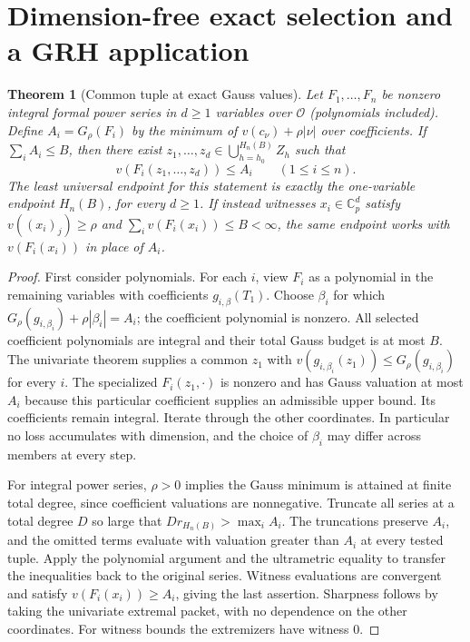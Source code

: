 \documentclass[11pt]{article}
\newtheorem{theorem}{Theorem}[section]
\theoremstyle{remark}\newtheorem{remark}[theorem]{Remark}
\newcommand{\Cp}{\mathbb C_p}
\newcommand{\OO}{\mathcal O}
\begin{document}
\section{Dimension-free exact selection and a GRH application}\label{sec:multi}
\begin{theorem}[Common tuple at exact Gauss values]\label{thm:multi}
Let $F_1,\ldots,F_n$ be nonzero integral formal power series in $d\ge1$ variables over $\OO$ (polynomials included). Define $A_i=G_\rho(F_i)$ by the minimum of $v(c_\nu)+\rho|\nu|$ over coefficients. If $\sum_i A_i\le B$, then there exist $z_1,\ldots,z_d\in\bigcup_{h=h_0}^{H_n(B)} Z_h$ such that
\[
 v(F_i(z_1,\ldots,z_d))\le A_i\qquad(1\le i\le n).
\]
The least universal endpoint for this statement is exactly the one-variable endpoint $H_n(B)$, for every $d\ge1$. If instead witnesses $x_i\in\Cp^d$ satisfy $v((x_i)_j)\ge\rho$ and $\sum_i v(F_i(x_i))\le B<\infty$, the same endpoint works with $v(F_i(x_i))$ in place of $A_i$.
\end{theorem}
\begin{proof}
First consider polynomials. For each $i$, view $F_i$ as a polynomial in the remaining variables with coefficients $g_{i,\beta}(T_1)$. Choose $\beta_i$ for which $G_\rho(g_{i,\beta_i})+\rho|\beta_i|=A_i$; the coefficient polynomial is nonzero. All selected coefficient polynomials are integral and their total Gauss budget is at most $B$. The univariate theorem supplies a common $z_1$ with $v(g_{i,\beta_i}(z_1))\le G_\rho(g_{i,\beta_i})$ for every $i$. The specialized $F_i(z_1,\cdot)$ is nonzero and has Gauss valuation at most $A_i$ because this particular coefficient supplies an admissible upper bound. Its coefficients remain integral. Iterate through the other coordinates. In particular no loss accumulates with dimension, and the choice of $\beta_i$ may differ across members at every step.

For integral power series, $\rho>0$ implies the Gauss minimum is attained at finite total degree, since coefficient valuations are nonnegative. Truncate all series at a total degree $D$ so large that $D r_{H_n(B)}>\max_i A_i$. The truncations preserve $A_i$, and the omitted terms evaluate with valuation greater than $A_i$ at every tested tuple. Apply the polynomial argument and the ultrametric equality to transfer the inequalities back to the original series. Witness evaluations are convergent and satisfy $v(F_i(x_i))\ge A_i$, giving the last assertion. Sharpness follows by taking the univariate extremal packet, with no dependence on the other coordinates. For witness bounds the extremizers have witness $0$.
\end{proof}
\end{document}
